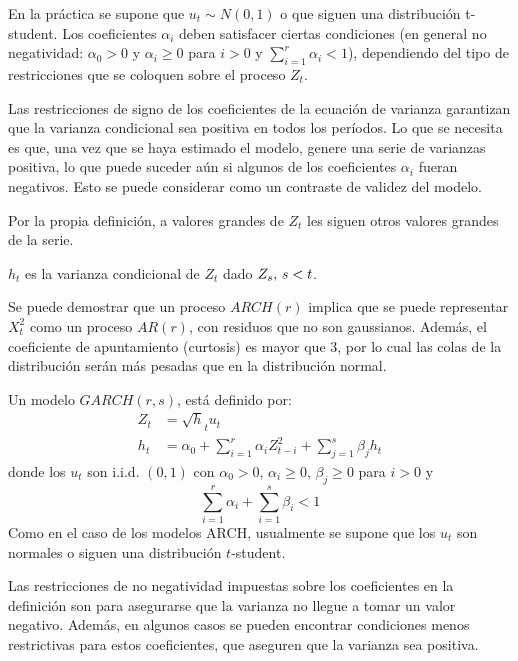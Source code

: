 En la pr\'{a}ctica se supone que $u_{t}\sim N(0,1)$ o que siguen una 
distribuci\'{o}n t-student. Los coeficientes $\alpha_{i}$ deben satisfacer 
ciertas condiciones (en general no negatividad: $\alpha_{0}>0$ y $\alpha_{i}\ge 0$ para $i>0$ y $\sum_{i=1}^r \alpha_{i} <1$), dependiendo del tipo de 
restricciones que se coloquen sobre el proceso $Z_{t}$. 

Las restricciones de signo de los coeficientes de 
la ecuaci\'{o}n de varianza garantizan que la varianza condicional sea 
positiva en todos los per\'{i}odos. Lo que se necesita es que, una vez que 
se haya estimado el modelo, genere una serie de varianzas positiva, lo que 
puede suceder a\'{u}n si algunos de los coeficientes $\alpha_{i}$ fueran 
negativos. Esto se puede considerar como un contraste de validez del modelo.

Por la propia definici\'{o}n, a valores grandes de $Z_{t}$ les siguen otros 
valores grandes de la serie.

$h_{t}$ es la varianza condicional de $Z_{t}$ dado $Z_{s},\thinspace s<t$.

\begin{observacion}
Se puede demostrar que un proceso $ARCH(r)$ implica que se puede representar $X_{t}^{2}$ como un proceso $AR(r)$, con residuos que no son gaussianos. Adem\'{a}s, el coeficiente de apuntamiento (curtosis) es mayor que 3, por lo cual las colas de la distribuci\'{o}n 
ser\'{a}n m\'{a}s pesadas que en la distribuci\'{o}n normal.
\end{observacion}

\begin{definicion}
Un modelo $GARCH(r,s)$, 
est\'{a} definido por:
\begin{align*}
 Z_{t}&=\sqrt h_{t} u_{t} \\ 
 h_{t}&=\alpha_{0}+\sum_{i=1}^r {\alpha_{i}Z_{t-i}^{2}} 
+\sum_{j=1}^s {\beta_{j}h_{t}} 
\end{align*}
donde los $u_{t}$ son i.i.d. $(0,1)$ con $\alpha_{0}>0$, $\alpha_{i}\ge 0$, 
$\beta_{j}\ge 0$ para $i>0$ y
\[
\sum_{i=1}^r \alpha_{i} +\sum_{i=1}^s \beta_{i} <1
\]
Como en el caso de los modelos ARCH, usualmente se supone que los $u_{t}$ 
son normales o siguen una distribuci\'{o}n $t$-student.
\end{definicion}

Las restricciones de no negatividad impuestas 
sobre los coeficientes en la definici\'{o}n son para asegurarse que la 
varianza no llegue a tomar un valor negativo. Adem\'{a}s, en algunos casos 
se pueden encontrar condiciones menos restrictivas para estos coeficientes, 
que aseguren que la varianza sea positiva. 

